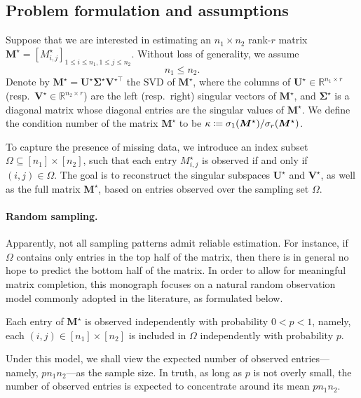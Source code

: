 \subsection{Problem formulation and assumptions}
\label{sec:problem-formulation-MC}

Suppose that we are interested in estimating an $n_{1}\times n_{2}$  rank-$r$ matrix  $\bm{M}^{\star} = [{M}^{\star}_{i,j}]_{1\leq i\leq n_1, 1\leq j\leq n_2}$.
Without loss of generality, we assume
$$n_{1}\leq n_{2}.$$  Denote by  $\bm{M}^{\star}=\bm{U}^{\star}\bm{\Sigma}^{\star}\bm{V}^{\star\top}$ the SVD of $\bm{M}^{\star}$, where the columns of $\bm{U}^{\star}\in \mathbb{R}^{n_1\times r}$ (resp.~$\bm{V}^{\star}\in \mathbb{R}^{n_2\times r}$) are the left (resp.~right) singular vectors of $\bm{M}^{\star}$, and $\bm{\Sigma}^{\star}$ is a diagonal matrix whose diagonal entries are the singular values of $\bm{M}^{\star}$. We define the condition number of the matrix $\bm{M}^{\star}$ to be $\kappa \coloneqq \sigma_1({\boldsymbol M}^\star)/\sigma_r({\boldsymbol M}^\star)$.


To capture the presence of missing data, we introduce an index subset $\Omega\subseteq [n_1]\times [n_2]$,
such that each entry ${M}^{\star}_{i,j}$ is observed if and only if $(i,j)\in \Omega$.
The goal is to reconstruct the singular subspaces $\bm{U}^{\star}$ and $\bm{V}^{\star}$, as well as the  full matrix $\bm{M}^{\star}$, based on entries observed over the sampling set $\Omega$.



\paragraph{Random sampling.}
Apparently, not all sampling patterns admit reliable estimation. For instance, if $\Omega$ contains only entries in the top half of the matrix,
then there is in general no hope to predict the bottom half of the matrix. In order to allow for meaningful matrix completion,
this monograph focuses on a natural random observation model commonly adopted in the literature, as formulated below.
%
\begin{assumption}
\label{assump:mc-bernoulli}
Each entry of $\bm{M}^{\star}$ is observed independently with probability $0<p<1$, namely,
each $(i,j)\in [ n_{1}] \times [n_{2}]$ is included in $\Omega$ independently with probability $p$.
\end{assumption}
%
Under this model, we shall view the expected number of observed entries---namely, $pn_1n_2$---as the sample size. In truth, as long as $p$ is not overly small,  the number of observed entries is expected to concentrate  around its mean $pn_1n_2$.




